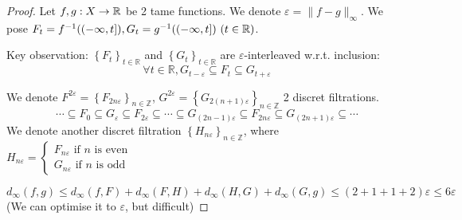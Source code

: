 \begin{proof}
  Let $f, g : X \to \mathbb{R}$ be 2 tame functions. We denote $\varepsilon = \|f-g\|_\infty$.
  We pose $F_t = f^{-1}((-\infty, t]), G_t = g^{-1}((-\infty, t])~(t\in \mathbb{R})$.

  Key observation: $\left\{F_t\right\}_{t \in \mathbb{R}}$ and $\left\{G_t\right\}_{t \in \mathbb{R}}$
  are $\varepsilon$-interleaved w.r.t. inclusion:\\
  $$
  \forall t \in \mathbb{R}, G_{t-\varepsilon} \subseteq F_t \subseteq G_{t+\varepsilon}
  $$

  We denote
  $F^{2 \varepsilon}=\left\{F_{2 n \varepsilon}\right\}_{n \in \mathbb{Z}}$,
  $G^{2 \varepsilon}=\left\{G_{2(n+1) \varepsilon}\right\}_{n \in \mathbb{Z}}$
  2 discret filtrations.
  $$
  \cdots \subseteq F_0 \subseteq G_{\varepsilon} \subseteq F_{2 \varepsilon} \subseteq \cdots \subseteq G_{(2 n-1) \varepsilon} \subseteq F_{2 n \varepsilon} \subseteq G_{(2 n+1) \varepsilon} \subseteq \cdots
  $$
  We denote another discret filtration $\left\{H_{n \varepsilon}\right\}_{n \in \mathbb{Z}}$, where $H_{n \varepsilon}=\left\{\begin{array}{l}F_{n \varepsilon} \text { if } n \text { is even } \\ G_{n \varepsilon} \text { if } n \text { is odd }\end{array}\right.$

  $$
  d_\infty(f, g) \le d_\infty(f, F) + d_\infty(F, H) + d_\infty(H, G) + d_\infty(G, g)
  \le (2+1+1+2)\varepsilon \le 6\varepsilon
  $$
  (We can optimise it to $\varepsilon$, but difficult)
  
\end{proof}
